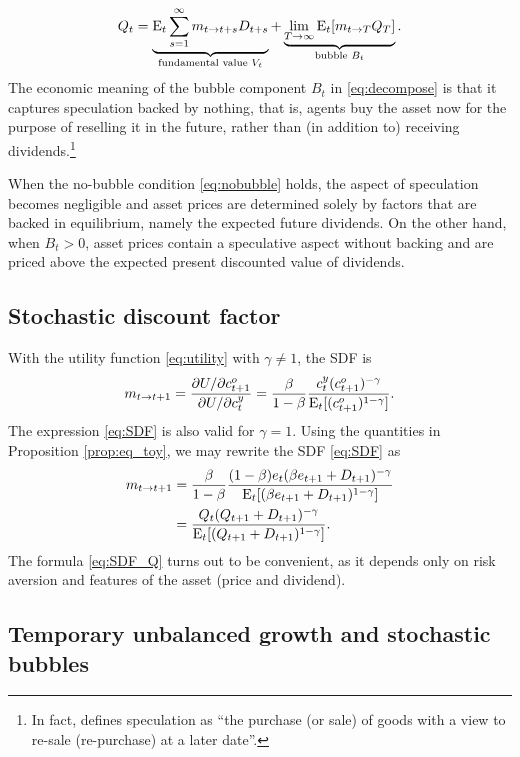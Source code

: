 \documentclass[a4paper,12pt]{article}
\numberwithin{equation}{section}
\theoremstyle{plain}
\begin{document}
\begin{equation}
    Q_t=\underbrace{\operatorname{E}_t\sum_{s=1}^\infty m_{t\to t+s}D_{t+s}}_\text{fundamental value $V_t$}+\underbrace{\lim_{T\to\infty}\operatorname{E}_t[m_{t\to T}Q_T]}_\text{bubble $B_t$}. \label{eq:decompose}
\end{equation}
The economic meaning of the bubble component $B_t$ in \eqref{eq:decompose} is that it captures speculation backed by nothing, that is, agents buy the asset now for the purpose of reselling it in the future, rather than (in addition to) receiving dividends.\footnote{In fact, \citet[p.~1]{Kaldor1939} defines speculation as ``the purchase (or sale) of goods with a view to re-sale (re-purchase) at a later date''.}

When the no-bubble condition \eqref{eq:nobubble} holds, the aspect of speculation becomes negligible and asset prices are determined solely by factors that are backed in equilibrium, namely the expected future dividends. On the other hand, when $B_t>0$, asset prices contain a speculative aspect without backing and are priced above the expected present discounted value of dividends.

\subsection{Stochastic discount factor}\label{subsec:toy_SDF}

With the utility function \eqref{eq:utility} with $\gamma\neq 1$, the SDF is
\begin{equation}
    m_{t\to t+1}=\frac{\partial U/\partial c_{t+1}^o}{\partial U/\partial c_t^y}=\frac{\beta}{1-\beta}\frac{c_t^y(c_{t+1}^o)^{-\gamma}}{\operatorname{E}_t[(c_{t+1}^o)^{1-\gamma}]}. \label{eq:SDF}
\end{equation}
The expression \eqref{eq:SDF} is also valid for $\gamma=1$. Using the quantities in Proposition \ref{prop:eq_toy}, we may rewrite the SDF \eqref{eq:SDF} as
\begin{align}
    m_{t\to t+1}&=\frac{\beta}{1-\beta}\frac{(1-\beta)e_t (\beta e_{t+1}+D_{t+1})^{-\gamma}}{\operatorname{E}_t[(\beta e_{t+1}+D_{t+1})^{1-\gamma}]} \notag \\
    &=\frac{Q_t(Q_{t+1}+D_{t+1})^{-\gamma}}{\operatorname{E}_t[(Q_{t+1}+D_{t+1})^{1-\gamma}]}. \label{eq:SDF_Q}
\end{align}
The formula \eqref{eq:SDF_Q} turns out to be convenient, as it depends only on risk aversion and features of the asset (price and dividend).

\subsection{Temporary unbalanced growth and stochastic bubbles}
\end{document}
